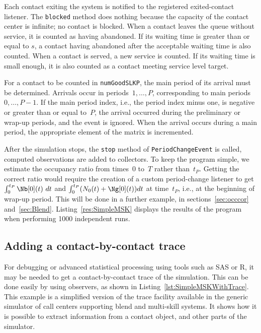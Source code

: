 Each contact exiting the system is notified to the registered
exited-contact listener.  The \texttt{blocked} method does nothing
because
the capacity of the contact center is infinite; no contact is
blocked.   When a contact leaves the queue without service, it is
counted as having abandoned.
If its waiting time is greater than or equal
to $s$, a contact having abandoned after the acceptable waiting time
is also counted.  When a
contact is served, a new service is counted.  If its waiting time is
small enough, it is also counted as a contact meeting service level
target.

For a contact to be counted in \texttt{numGoodSLKP}, the main
period of its arrival must be
determined.  Arrivals occur in periods~$1,\ldots,P$,
corresponding to main periods~$0,\ldots,P-1$.
If the main period index, i.e., the period index minus one, is
negative or greater than or equal to~$P$,
the arrival occurred during the preliminary or
wrap-up periods, and the event is ignored.  When the arrival occurs
during a main period, the appropriate element of the matrix is
incremented.



After the simulation stops, the \texttt{stop} method of
\texttt{Period\-Change\-Event} is called,
computed observations are added to collectors.
To keep the program simple, we estimate the occupancy ratio from
times~0 to~$T$ rather than~$t_P$.  Getting the correct ratio would
require the creation of a custom period-change listener to get
$\int_0^{t_P}\Nb[0](t)\ dt$ and $\int_0^{t_P} (N_0(t)+\Ng[0](t)) dt$ at
time~$t_P$, i.e., at the beginning of wrap-up period.
This will be done in a further example, in sections~\ref{sec:occcor}
and~\ref{sec:Blend}.
Listing~\ref{res:SimpleMSK} displays the results of the program when
performing 1000 independent runs.


\subsection{Adding a contact-by-contact trace}

For debugging or advanced statistical processing using tools such as
SAS or R, it may be
needed to get a contact-by-contact trace of the simulation. This can be done
easily by using observers, as shown in
Listing~\ref{lst:SimpleMSKWithTrace}.
This example is a simplified version of the trace facility available
in the generic simulator of call centers supporting blend and
multi-skill systems.
It shows how it is possible to extract information from a contact
object, and other parts of the simulator.

